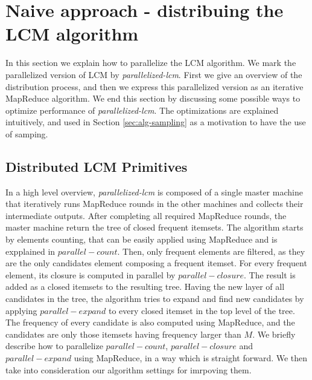 \section{Naive approach - distribuing the LCM algorithm}
\label{sec:alg}
In this section we explain how to parallelize the LCM
algorithm. We mark the parallelized version of LCM by
\textit{parallelized-lcm}. First we give an overview of the
distribution process, and then we express this parallelized
version as an iterative MapReduce algorithm. We end this
section by discussing some possible ways to optimize
performance of \textit{parallelized-lcm}. The optimizations
are explained intuitively, and used in Section \ref{sec:alg-sampling} as a
motivation to have the use of samping.

\subsection{Distributed LCM Primitives}
In a high level overview, \textit{parallelized-lcm} is
composed of a single master machine that iteratively runs
MapReduce rounds in the other machines and collects their
intermediate outputs. After completing all required
MapReduce rounds, the master machine return the tree of
closed frequent itemsets. The algorithm starts by elements
counting, that can be easily applied using MapReduce and is
expplained in $parallel-count$.
Then, only frequent elements are filtered, as they are the only
candidates element composing a frequent itemset. For
every frequent element, its closure is computed in parallel
by $parallel-closure$. The result is added as a closed
itemsets to the resulting tree. Having the new layer of all
candidates in the tree, the algorithm tries to expand and
find new candidates by applying $parallel-expand$ to every
closed itemset in the top level of the tree. The frequency
of every candidate is also computed using MapReduce, and the
candidates are only those itemsets having frequency larger
than $M$. We briefly describe how to
parallelize $parallel-count$, $parallel-closure$ and
$parallel-expand$ using MapReduce, in a way which is
straight forward. We then take into consideration our
algorithm settings for imrpoving them.
 

